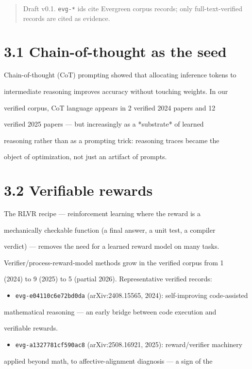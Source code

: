 \documentclass[11pt]{article}
\begin{document}
\begin{quote}Draft v0.1. \texttt{evg-*} ids cite Evergreen corpus records; only full-text-verified records are cited as evidence.\end{quote}

\section{3.1 Chain-of-thought as the seed}

Chain-of-thought (CoT) prompting showed that allocating inference tokens to

intermediate reasoning improves accuracy without touching weights. In our

verified corpus, CoT language appears in 2 verified 2024 papers and 12

verified 2025 papers --- but increasingly as a *substrate* of learned

reasoning rather than as a prompting trick: reasoning traces became the

object of optimization, not just an artifact of prompts.


\section{3.2 Verifiable rewards}

The RLVR recipe --- reinforcement learning where the reward is a

mechanically checkable function (a final answer, a unit test, a compiler

verdict) --- removes the need for a learned reward model on many tasks.

Verifier/process-reward-model methods grow in the verified corpus from 1

(2024) to 9 (2025) to 5 (partial 2026). Representative verified records:


\begin{itemize}
\item \texttt{evg-e04110c6e72bd0da} (arXiv:2408.15565, 2024): self-improving code-assisted
\end{itemize}
mathematical reasoning --- an early bridge between code execution and

verifiable rewards.

\begin{itemize}
\item \texttt{evg-a1327781cf590ac8} (arXiv:2508.16921, 2025): reward/verifier machinery
\end{itemize}
applied beyond math, to affective-alignment diagnosis --- a sign of the
\end{document}
